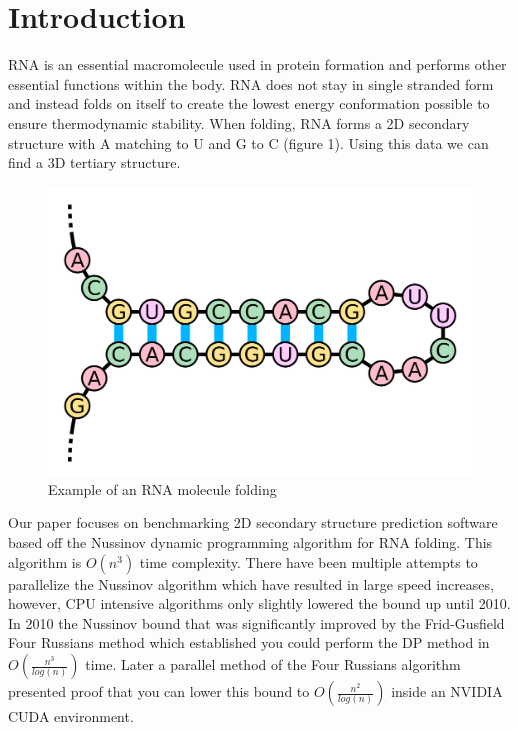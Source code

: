 \documentclass[12pt]{article}
\begin{document}
\section{Introduction}
\par RNA is an essential macromolecule used in protein formation and performs
other essential functions within the body\cite{turner}. RNA does not stay in
single stranded form and instead folds on itself to create the lowest energy
conformation possible to ensure thermodynamic stability\cite{herschlag}. When
folding, RNA forms a 2D secondary structure\cite{mccaskill} with A matching to U
and G to C (figure 1).  Using this data we can find a 3D tertiary structure\cite{mccaskill}.
\begin{figure}[ht!]
  \centering
  \includegraphics[keepaspectratio, scale=0.12]{fold-example.png}
  \caption{Example of an RNA molecule folding}
  \label{fig:RNA Folding}
\end{figure}
\par Our paper focuses on benchmarking 2D secondary structure prediction software
based off the Nussinov dynamic programming algorithm\cite{nussinov} for RNA folding.
This algorithm is $O(n^3)$ time complexity. There have been multiple attempts to
parallelize the Nussinov algorithm\cite{rizk, other-gpu} which have resulted in
large speed increases, however, CPU intensive algorithms only slightly lowered
the bound up until 2010\cite{minor-nussinov-improvement, chan}. In 2010 the
Nussinov bound that was significantly improved by the Frid-Gusfield Four Russians
method which established you could perform the DP method in $O(\frac{n^3}{log(n)})$
time\cite{gusfield}. Later a parallel method of the Four Russians algorithm
presented proof that you can lower this bound to $O(\frac{n^2}{log(n)})$ inside
an NVIDIA CUDA environment\cite{balaji}.
\end{document}
